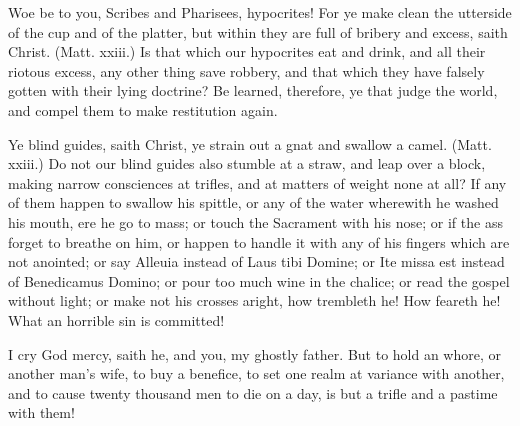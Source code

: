 \documentclass{custom}
\begin{document}
Woe be to you, Scribes and Pharisees, hypocrites! 
For ye make clean the utterside of the cup and of the 
platter, but within they are full of bribery and excess, 
saith Christ. (Matt. xxiii.) Is that which our hypocrites 
eat and drink, and all their riotous excess, any other thing 
save robbery, and that which they have falsely gotten with 
their lying doctrine? Be learned, therefore, ye that judge 
the world, and compel them to make restitution again. 

Ye blind guides, saith Christ, ye strain out a gnat and 
swallow a camel. (Matt. xxiii.) Do not our blind 
guides also stumble at a straw, and leap over a block, 
making narrow consciences at trifles, and at matters of 
weight none at all? If any of them happen to swallow 
his spittle, or any of the water wherewith he washed his 
mouth, ere he go to mass; or touch the Sacrament with 
his nose; or if the ass forget to breathe on him, or happen 
to handle it with any of his fingers which are not anointed; 
or say Alleuia instead of Laus tibi Domine; or Ite 
missa est instead of Benedicamus Domino; or pour too 
much wine in the chalice; or read the gospel without 
light; or make not his crosses aright, how trembleth he! 
How feareth he! What an horrible sin is committed! 

I cry God mercy, saith he, and you, my ghostly father. 
But to hold an whore, or another man's wife, to buy a 
benefice, to set one realm at variance with another, and to 
cause twenty thousand men to die on a day, is but a 
trifle and a pastime with them! 
\end{document}
